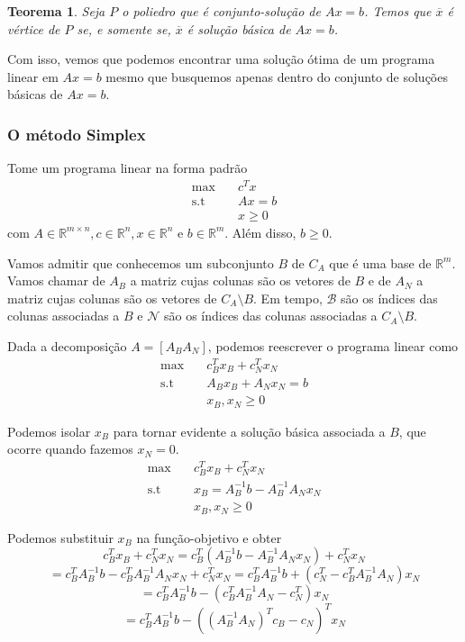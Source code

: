 \documentclass[]{article}
\newtheorem{teorema}{Teorema}
\numberwithin{equation}{section}
\begin{document}
\begin{teorema}
  Seja $P$ o poliedro que é conjunto-solução de $Ax = b$. Temos que $\overline{x}$ é vértice de $P$
  se, e somente se, $\overline{x}$ é solução básica de $Ax = b$.
\end{teorema}

Com isso, vemos que podemos encontrar uma solução ótima de um programa linear em $Ax = b$ mesmo que
busquemos apenas dentro do conjunto de soluções básicas de $Ax = b$.

\subsubsection{O método Simplex}

Tome um programa linear na forma padrão
\begin{align}
\max        &\quad  c^Tx \\
\text{s.t}  &\quad  Ax = b \\
            &\quad  x \geq 0
\end{align}
com $A \in \mathbb{R}^{m \times n}, c \in \mathbb{R}^n, x \in \mathbb{R}^n$ e $b \in \mathbb{R}^m$.
Além disso, $b \geq 0$.

Vamos admitir que conhecemos um subconjunto $B$ de $C_A$ que é uma base de $\mathbb{R}^m$.
Vamos chamar de $A_B$ a matriz cujas colunas são os vetores de $B$ e de $A_N$ a matriz cujas colunas
são os vetores de $C_A \setminus B$.
Em tempo, $\mathcal{B}$ são os índices das colunas associadas a $B$ e $\mathcal{N}$ são os índices das
colunas associadas a $C_A \setminus B$.

Dada a decomposição $A = [A_B A_N]$, podemos reescrever o programa linear como
\begin{align}
\max        &\quad  c_B^Tx_B + c_N^Tx_N \\
\text{s.t}  &\quad  A_Bx_B + A_Nx_N = b \\
            &\quad  x_B, x_N \geq 0
\end{align}

Podemos isolar $x_B$ para tornar evidente a solução básica associada a $B$, que ocorre quando
fazemos $x_N = 0$.
\begin{align}
\max        &\quad  c_B^Tx_B + c_N^Tx_N \\
\text{s.t}  &\quad  x_B = A_B^{-1}b - A_B^{-1}A_Nx_N \\
            &\quad  x_B, x_N \geq 0
\end{align}

Podemos substituir $x_B$ na função-objetivo e obter
$$
c_B^Tx_B + c_N^Tx_N = c_B^T(A_B^{-1}b - A_B^{-1}A_Nx_N) + c_N^Tx_N $$
$$
= c_B^TA_B^{-1}b - c_B^TA_B^{-1}A_Nx_N + c_N^Tx_N = c_B^TA_B^{-1}b + (c_N^T - c_B^TA_B^{-1}A_N)x_N
$$
$$
= c_B^TA_B^{-1}b - (c_B^TA_B^{-1}A_N - c_N^T)x_N
$$
$$
= c_B^TA_B^{-1}b - ((A_B^{-1}A_N)^Tc_B - c_N)^Tx_N
$$
\end{document}
